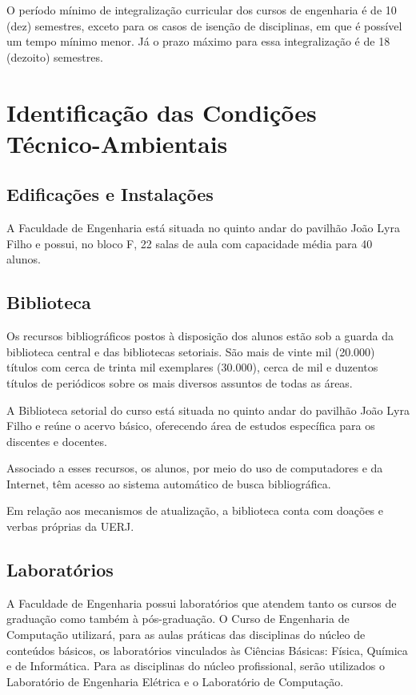 O período mínimo de integralização curricular dos cursos de engenharia é de 10 (dez) semestres, exceto para os casos de isenção de disciplinas, em que é possível um tempo mínimo menor. Já o prazo máximo para essa integralização é de 18 (dezoito) semestres.


\section{Identificação das Condições Técnico-Ambientais}

\subsection{Edificações e Instalações}
A Faculdade de Engenharia está situada no quinto andar do pavilhão João Lyra Filho e possui, no bloco F, 22 salas de aula com capacidade média para 40 alunos.

\subsection{Biblioteca}
Os recursos bibliográficos postos à disposição dos alunos estão sob a guarda da biblioteca central e das bibliotecas setoriais. São mais de vinte mil (20.000) títulos com cerca de trinta mil exemplares (30.000), cerca de mil e duzentos títulos de periódicos sobre os mais diversos assuntos de todas as áreas.

A Biblioteca setorial do curso está situada no quinto andar do pavilhão João Lyra Filho e reúne o acervo básico, oferecendo área de estudos específica para os discentes e docentes.

Associado a esses recursos, os alunos, por meio do uso de computadores e da Internet, têm acesso ao sistema automático de busca bibliográfica.

Em relação aos mecanismos de atualização, a biblioteca conta com doações e verbas próprias da UERJ.

\subsection{Laboratórios}
A Faculdade de Engenharia possui laboratórios que atendem tanto os cursos de graduação como também à pós-graduação. O Curso de Engenharia de Computação utilizará, para as aulas práticas das disciplinas do núcleo de conteúdos básicos, os laboratórios vinculados às Ciências Básicas: Física, Química e de Informática. Para as disciplinas do núcleo profissional, serão utilizados o Laboratório de Engenharia Elétrica e o Laboratório de Computação.

